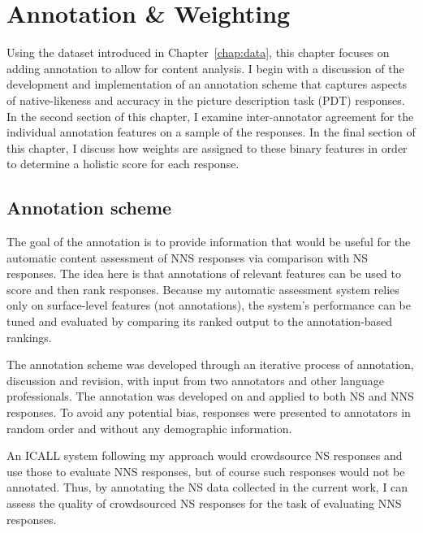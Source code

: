 \chapter{Annotation \& Weighting}
\label{chap:annotation}

Using the dataset introduced in Chapter~\ref{chap:data}, this chapter focuses on adding annotation to allow for content analysis. I begin with a discussion of the development and implementation of an annotation scheme that captures aspects of native-likeness and accuracy in the picture description task (PDT) responses. In the second section of this chapter, I examine inter-annotator agreement for the individual annotation features on a sample of the responses. In the final section of this chapter, I discuss how weights are assigned to these binary features in order to determine a holistic score for each response.

\section{Annotation scheme}
\label{sec:scheme}
The goal of the annotation is to provide information that would be useful for the automatic content assessment of NNS responses via comparison with NS responses. The idea here is that annotations of relevant features can be used to score and then rank responses. Because my automatic assessment system relies only on surface-level features (not annotations), the system's performance can be tuned and evaluated by comparing its ranked output to the annotation-based rankings.
%

The annotation scheme was developed through an iterative process of annotation, discussion and revision, with input from two annotators and other language professionals. The annotation was developed on and applied to both NS and NNS responses. To avoid any potential bias, responses were presented to annotators in random order and without any demographic information.

An ICALL system following my approach would crowdsource NS responses and use those to evaluate NNS responses, but of course such responses would not be annotated. Thus, by annotating the NS data collected in the current work, I can assess the quality of crowdsourced NS responses for the task of evaluating NNS responses. 


